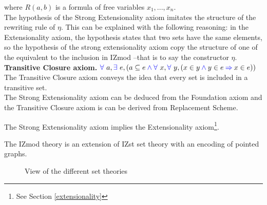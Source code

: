 \documentclass[a4paper]{article}
\begin{document}
where $R(a,b)$ is a formula of free variables $x_1, ..., x_n$. \\

The hypothesis of the Strong Extensionality axiom imitates the structure of the rewriting rule of $\eta$. This can be explained with the following reasoning: in the Extensionality axiom, the hypothesis states that two sets have the same elements, so the hypothesis of the strong extensionality axiom copy the structure of one of the equivalent to the inclusion in IZmod --that is to say the constructor $\eta$. \\

\textbf{Transitive Closure axiom.} ${\color{blue} \forall}~a,{\color{blue} \exists}~e, (a \subseteq e \mathbin{\color{blue} \wedge} {\color{blue} \forall}~x,{\color{blue} \forall}~y, (x \in y \mathbin{\color{blue} \wedge} y \in e \mathbin{\color{blue} \Rightarrow} x \in e))$ \\

The Transitive Closure axiom conveys the idea that every set is included in a transitive set. \\

The Strong Extensionality axiom can be deduced from the Foundation axiom and the Transitive Closure axiom is can be derived from Replacement Scheme.

The Strong Extensionality axiom implies the Extensionality axiom\footnote{See Section \ref{extensionality}}.

The IZmod theory is an extension of IZst set theory with an encoding of pointed graphs.

\begin{figure}[h]
\centering
{}
\caption{View of the different set theories}
\end{figure}
\end{document}
